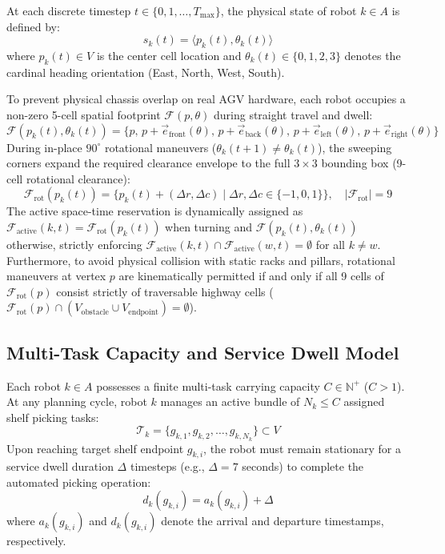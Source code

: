 \documentclass[journal]{IEEEtran}
\begin{document}
At each discrete timestep $t \in \{0, 1, \dots, T_{\max}\}$, the physical state of robot $k \in A$ is defined by:
\begin{equation}
s_k(t) = \langle p_k(t), \theta_k(t) \rangle
\end{equation}
where $p_k(t) \in V$ is the center cell location and $\theta_k(t) \in \{0, 1, 2, 3\}$ denotes the cardinal heading orientation (East, North, West, South). 

To prevent physical chassis overlap on real AGV hardware, each robot occupies a non-zero 5-cell spatial footprint $\mathcal{F}(p, \theta)$ during straight travel and dwell:
\begin{equation}
\mathcal{F}(p_k(t), \theta_k(t)) = \{p, \, p + \vec{e}_{\text{front}}(\theta), \, p + \vec{e}_{\text{back}}(\theta), \, p + \vec{e}_{\text{left}}(\theta), \, p + \vec{e}_{\text{right}}(\theta)\}
\end{equation}
During in-place $90^\circ$ rotational maneuvers ($\theta_k(t+1) \neq \theta_k(t)$), the sweeping corners expand the required clearance envelope to the full $3 \times 3$ bounding box (9-cell rotational clearance):
\begin{equation}
\mathcal{F}_{\text{rot}}(p_k(t)) = \{p_k(t) + (\Delta r, \Delta c) \mid \Delta r, \Delta c \in \{-1, 0, 1\}\}, \quad |\mathcal{F}_{\text{rot}}| = 9
\end{equation}
The active space-time reservation is dynamically assigned as $\mathcal{F}_{\text{active}}(k, t) = \mathcal{F}_{\text{rot}}(p_k(t))$ when turning and $\mathcal{F}(p_k(t), \theta_k(t))$ otherwise, strictly enforcing $\mathcal{F}_{\text{active}}(k, t) \cap \mathcal{F}_{\text{active}}(w, t) = \emptyset$ for all $k \neq w$. Furthermore, to avoid physical collision with static racks and pillars, rotational maneuvers at vertex $p$ are kinematically permitted if and only if all 9 cells of $\mathcal{F}_{\text{rot}}(p)$ consist strictly of traversable highway cells ($\mathcal{F}_{\text{rot}}(p) \cap (V_{\text{obstacle}} \cup V_{\text{endpoint}}) = \emptyset$).

\subsection{Multi-Task Capacity and Service Dwell Model}
Each robot $k \in A$ possesses a finite multi-task carrying capacity $C \in \mathbb{N}^+$ ($C > 1$). At any planning cycle, robot $k$ manages an active bundle of $N_k \le C$ assigned shelf picking tasks:
\begin{equation}
\mathcal{T}_k = \{g_{k,1}, g_{k,2}, \dots, g_{k,N_k}\} \subset V
\end{equation}
Upon reaching target shelf endpoint $g_{k,i}$, the robot must remain stationary for a service dwell duration $\Delta$ timesteps (e.g., $\Delta = 7$ seconds) to complete the automated picking operation:
\begin{equation}
d_k(g_{k,i}) = a_k(g_{k,i}) + \Delta
\end{equation}
where $a_k(g_{k,i})$ and $d_k(g_{k,i})$ denote the arrival and departure timestamps, respectively.
\end{document}
